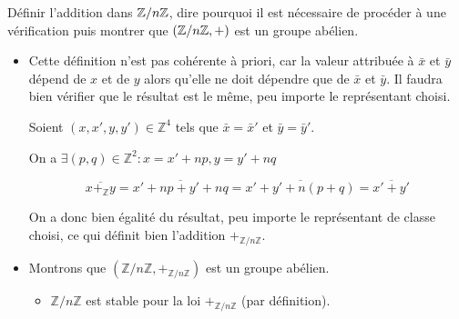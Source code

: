 \documentclass{article}
\begin{document}
\begin{question_kholle}{Définir l’addition dans $\mathbb Z/n\mathbb Z$, dire pourquoi il est nécessaire de procéder à une vérification puis montrer que $(\mathbb Z/n\mathbb Z, +)$ est un groupe abélien.}
  \begin{itemize}[label=$\star$]
    \item Cette définition n'est pas cohérente à priori, car la valeur attribuée à $\bar x$ et $\bar y$ dépend de $x$ et de $y$ alors qu'elle ne doit dépendre que de $\bar x$ et $\bar y$. Il faudra bien vérifier que le résultat est le même, peu importe le représentant choisi.

          Soient $(x, x', y, y') \in \mathbb{Z}^{4}$ tels que $\bar{x} = \bar{x}'$ et $\bar{y} = \bar{y}'$.

          On a $\exists (p, q) \in \mathbb{Z}^{2} : x = x' + np, y=y'+nq$

          $$
            \overline{x+_{\mathbb{Z}}y} = \overline{x'+np + y' + nq} = \overline{x'+y' + n(p+q)} = \overline{x'+y'}
          $$

          On a donc bien égalité du résultat, peu importe le représentant de classe choisi, ce qui définit bien l'addition $+_{\mathbb{Z}/n\mathbb{Z}}$.

    \item Montrons que $(\mathbb{Z}/n\mathbb{Z}, +_{\mathbb{Z}/n\mathbb{Z}})$ est un groupe abélien.
          \begin{itemize}[label=$\bullet$]
            \item $\mathbb{Z}/n\mathbb{Z}$ est stable pour la loi $+_{\mathbb{Z}/n\mathbb{Z}}$ (par définition).


\end{itemize}
\end{itemize}
\end{question_kholle}
\end{document}
